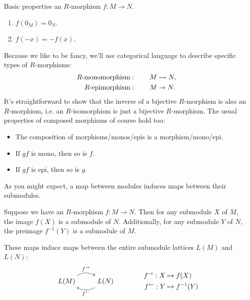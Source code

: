 \documentclass[twoside,10pt]{report}
\begin{document}
\begin{prop}
Basic properties an $R$-morphism $f:M\to N$.
\begin{enumerate}
	\item $f(0_{M})=0_{N}$.
	\item $f(-x)=-f(x)$.
\end{enumerate}
\end{prop}
Because we like to be fancy, we'll use categorical language to describe specific types of $R$-morphisms:
\begin{align*}
	R\text{-monomorphism}&: \quad\quad M \rightarrowtail N,\\
	R\text{-epimorphism}&: \quad\quad M \twoheadrightarrow N.
\end{align*}
It's straightforward to show that the inverse of a bijective $R$-morphism is also an $R$-morphism, i.e. an $R$-isomorphism is just a bijective $R$-morphism. The usual properties of composed morphisms of course hold too:
\begin{itemize}
	\item The composition of morphisms/monos/epis is a morphism/mono/epi.
	\item If $gf$ is mono, then so is $f$.
	\item If $gf$ is epi, then so is $g$.
\end{itemize}
As you might expect, a map between modules induces maps between their submodules.

\begin{prop}
	Suppose we have an $R$-morphism $f:M\to N$. Then for any submodule $X$ of $M$, the image $f(X)$ is a submodule of $N$. Additionally, for any submodule $Y$ of $N$, the preimage $f^{-1}(Y)$ is a submodule of $ M$.
\end{prop}
These maps induce maps between the entire submodule lattices $L(M)$ and $L(N)$:
\begin{equation*}
	\begin{aligned}[c]
		\begin{tikzcd}
			L(M) \rar[bend left]{f^{\to }} & L(N) \lar[bend left]{f^{\leftarrow}}
		\end{tikzcd}
	\end{aligned}
	\qquad\qquad
	\begin{aligned}[c]
		f^{\to }: X &\mapsto f(X) \\
	f^{\leftarrow}: Y &\mapsto f^{-1}(Y)
	\end{aligned}
\end{equation*}

\end{document}
